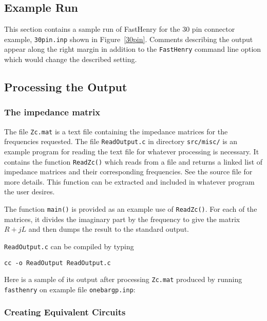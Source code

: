 \subsection{Example Run}

This section contains a sample run of FastHenry for the 30 pin
connector example, {\tt 30pin.inp} shown in Figure~\ref{30pin}.  Comments
describing the output appear along the right margin in addition to the
{\tt FastHenry} command line option which would change the described
setting.

{\small

}

\subsection{Processing the Output}
\label{processing}

\subsubsection{The impedance matrix}

The file {\tt Zc.mat} is a text file containing the impedance matrices
for the frequencies requested.  The file {\tt ReadOutput.c} in
directory {\tt src/misc/} is an example program for reading the text
file for whatever processing is necessary.  It contains the function
{\tt ReadZc()} which reads from a file and returns a linked list of
impedance matrices and their corresponding frequencies. See the source
file for more details.  This function can be extracted and included in
whatever program the user desires.

The function {\tt main()} is provided as an example use of
{\tt ReadZc()}.  For each of the matrices, it divides the
imaginary part by the frequency to give the matrix $R + jL$ and then
dumps the result to the standard output.

{\tt ReadOutput.c} can be compiled by typing
\begin{verbatim}
cc -o ReadOutput ReadOutput.c
\end{verbatim}

Here is a sample of its output after processing {\tt Zc.mat} produced
by running {\tt fasthenry} on example file {\tt onebargp.inp}:

{\small

}

\subsubsection{Creating Equivalent Circuits}

